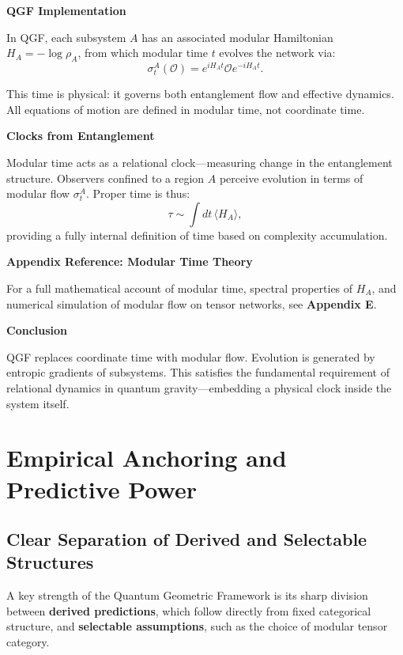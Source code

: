 \documentclass[11pt]{article}
\begin{document}
\vspace{0.5em}
\noindent\textbf{QGF Implementation}

In QGF, each subsystem \( A \) has an associated modular Hamiltonian \( H_A = -\log \rho_A \), from which modular time \( t \) evolves the network via:
\[
\sigma_t^A(\mathcal{O}) = e^{i H_A t} \mathcal{O} e^{-i H_A t}.
\]

This time is physical: it governs both entanglement flow and effective dynamics. All equations of motion are defined in modular time, not coordinate time.

\vspace{0.5em}
\noindent\textbf{Clocks from Entanglement}

Modular time acts as a relational clock—measuring change in the entanglement structure. Observers confined to a region \( A \) perceive evolution in terms of modular flow \( \sigma_t^A \). Proper time is thus:
\[
\tau \sim \int dt \, \langle H_A \rangle,
\]
providing a fully internal definition of time based on complexity accumulation.

\vspace{0.5em}
\noindent\textbf{Appendix Reference: Modular Time Theory}

For a full mathematical account of modular time, spectral properties of \( H_A \), and numerical simulation of modular flow on tensor networks, see \textbf{Appendix E}.

\vspace{0.5em}
\noindent\textbf{Conclusion}

QGF replaces coordinate time with modular flow. Evolution is generated by entropic gradients of subsystems. This satisfies the fundamental requirement of relational dynamics in quantum gravity—embedding a physical clock inside the system itself.



\section{Empirical Anchoring and Predictive Power}

\subsection{Clear Separation of Derived and Selectable Structures}

A key strength of the Quantum Geometric Framework is its sharp division between \textbf{derived predictions}, which follow directly from fixed categorical structure, and \textbf{selectable assumptions}, such as the choice of modular tensor category.
\end{document}
